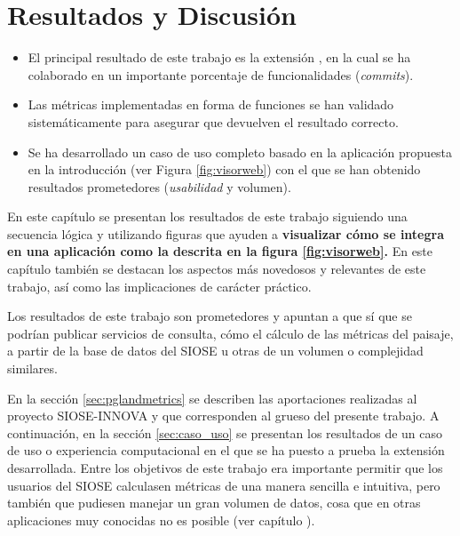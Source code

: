 \chapter{Resultados y Discusión}\label{chap:result}

\begin{graybox}
\begin{itemize}
\item El principal resultado de este trabajo es la extensión \pgland{}, en la cual se ha colaborado en un importante porcentaje de funcionalidades (\textit{commits}).
\item Las métricas implementadas en forma de funciones se han validado sistemáticamente para asegurar que devuelven el resultado correcto.
\item Se ha desarrollado un caso de uso completo basado en la aplicación propuesta en la introducción (ver Figura \ref{fig:visorweb}) con el que se han obtenido resultados prometedores (\textit{usabilidad} y volumen).
\end{itemize}
\end{graybox}


En este capítulo se presentan los resultados de este trabajo siguiendo una secuencia lógica y utilizando  figuras que ayuden a \textbf{visualizar cómo \pgland{} se integra en una aplicación como la descrita en la figura \ref{fig:visorweb}.} En este capítulo también se destacan los  aspectos más novedosos y relevantes de este trabajo, así como las implicaciones de carácter práctico.

Los resultados de este trabajo son prometedores y apuntan a que sí que se podrían publicar servicios de consulta, cómo el cálculo de las métricas del paisaje, a partir de la base de datos del SIOSE u otras de un volumen o complejidad similares.

En la sección \ref{sec:pglandmetrics} se describen las aportaciones realizadas al proyecto SIOSE-INNOVA y que corresponden al grueso del presente trabajo. A continuación, en la sección \ref{sec:caso_uso} se presentan los resultados de un caso de uso o experiencia computacional en el que se ha puesto a prueba la extensión desarrollada. Entre los objetivos de este trabajo era importante permitir que los usuarios del SIOSE calculasen métricas de una manera sencilla e intuitiva, pero también que pudiesen manejar un gran volumen de datos, cosa que en otras aplicaciones muy conocidas no es posible (ver capítulo ).

